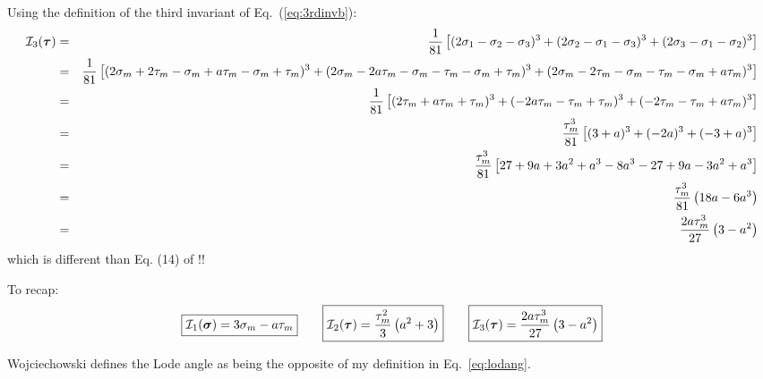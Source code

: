 Using the definition of the third invariant of Eq.~(\ref{eq:3rdinvb}):
\begin{eqnarray}
{\cal I}_3({\bm \tau}) 
&=& \frac{1}{81} \left[
(2\sigma_1-\sigma_2-\sigma_3)^3+
(2\sigma_2-\sigma_1-\sigma_3)^3+
(2\sigma_3-\sigma_1-\sigma_2)^3
\right] \nonumber\\
&=& \frac{1}{81} \left[
(2\sigma_m+2\tau_m-\sigma_m+a\tau_m-\sigma_m+\tau_m)^3+
(2\sigma_m-2a\tau_m-\sigma_m-\tau_m-\sigma_m+\tau_m)^3+
(2\sigma_m-2\tau_m-\sigma_m-\tau_m-\sigma_m+a\tau_m)^3
\right] \nonumber\\
&=& \frac{1}{81} \left[ (2\tau_m+a\tau_m+\tau_m)^3+ (-2a\tau_m-\tau_m+\tau_m)^3+ (-2\tau_m-\tau_m+a\tau_m)^3 \right] \nonumber\\
&=& \frac{\tau_m^3}{81} \left[ (3+a)^3+ (-2a)^3+ (-3+a)^3 \right] \nonumber\\
&=& \frac{\tau_m^3}{81} \left[ 27 +9a + 3a^2 + a^3  -8a^3 -27 +9a -3a^2 + a^3 \right] \nonumber\\
&=& \frac{\tau_m^3}{81} \left( 18a  -6 a^3  \right) \nonumber\\
&=& \frac{2a \tau_m^3}{27} \left( 3 - a^2  \right) 
\end{eqnarray}
which is different than Eq. (14) of \cite{wojc18}!!

To recap:
\begin{eqnarray}
\boxed{{\cal I}_1({\bm \sigma}) =  3\sigma_m -a\tau_m } 
\qquad
\boxed{{\cal I}_2({\bm \tau}) =\frac{\tau_m^2}{3}\left( a^2 +3 \right)}
\qquad
\boxed{{\cal I}_3({\bm \tau}) = \frac{2a \tau_m^3}{27} \left( 3 - a^2  \right) }
\end{eqnarray}

\begin{remark}
Wojciechowski \cite{wojc18} defines the Lode angle  
as being the opposite of my definition in Eq.~\ref{eq:lodang}.
\end{remark}

